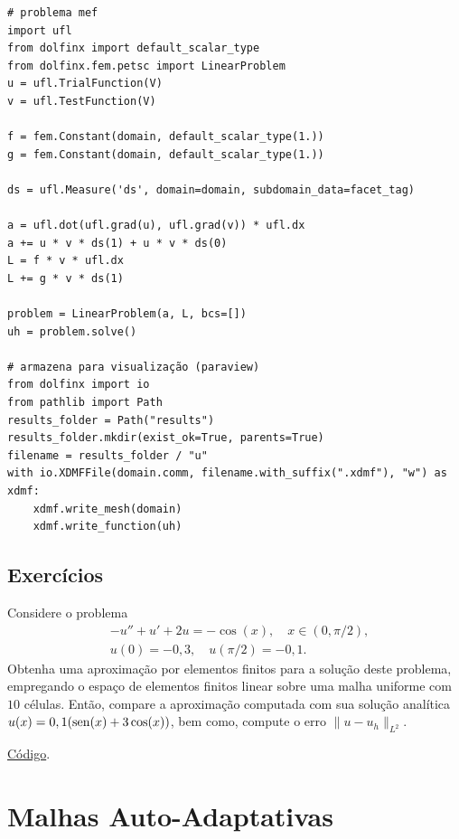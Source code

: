 \begin{ex}
\begin{lstlisting}
# problema mef
import ufl
from dolfinx import default_scalar_type
from dolfinx.fem.petsc import LinearProblem
u = ufl.TrialFunction(V)
v = ufl.TestFunction(V)

f = fem.Constant(domain, default_scalar_type(1.))
g = fem.Constant(domain, default_scalar_type(1.))

ds = ufl.Measure('ds', domain=domain, subdomain_data=facet_tag)

a = ufl.dot(ufl.grad(u), ufl.grad(v)) * ufl.dx
a += u * v * ds(1) + u * v * ds(0)
L = f * v * ufl.dx
L += g * v * ds(1)

problem = LinearProblem(a, L, bcs=[])
uh = problem.solve()

# armazena para visualização (paraview)
from dolfinx import io
from pathlib import Path
results_folder = Path("results")
results_folder.mkdir(exist_ok=True, parents=True)
filename = results_folder / "u"
with io.XDMFFile(domain.comm, filename.with_suffix(".xdmf"), "w") as xdmf:
    xdmf.write_mesh(domain)
    xdmf.write_function(uh)  
\end{lstlisting}

\end{ex}

\subsection{Exercícios}

\begin{exer}\label{exer:dcr}
  Considere o problema
  \begin{align}
    &-u'' + u' + 2u = -\cos(x),\quad x\in (0, \pi/2),\\
    &u(0)=-0,3,\quad u(\pi/2)=-0,1.
  \end{align}
  Obtenha uma aproximação por elementos finitos para a solução deste problema, empregando o espaço de elementos finitos linear sobre uma malha uniforme com $10$ células. Então, compare a aproximação computada com sua solução analítica $u(x) = 0,1(\operatorname{sen}(x)+3\cos(x))$, bem como, compute o erro $\|u-u_h\|_{L^2}$.
\end{exer}
\begin{resp}
  \ifispython
  \href{https://github.com/phkonzen/notas/blob/master/src/MetodoElementosFinitos/cap_mef1d/dados/exer_dcr/exer_dcr.py}{Código}.
  \fi
\end{resp}

\section{Malhas Auto-Adaptativas}\label{cap_mef1d_sec_adapt}

